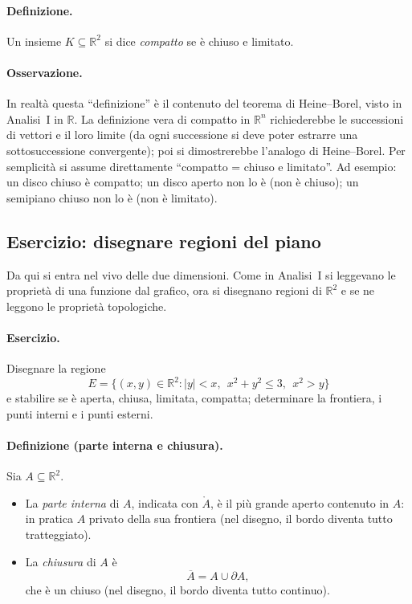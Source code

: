 \paragraph{Definizione.} Un insieme $K\subseteq\mathbb{R}^2$ si dice \emph{compatto} se è chiuso e limitato.

\paragraph{Osservazione.} In realtà questa ``definizione'' è il contenuto del teorema di Heine--Borel, visto in Analisi~I in $\mathbb{R}$. La definizione vera di compatto in $\mathbb{R}^n$ richiederebbe le successioni di vettori e il loro limite (da ogni successione si deve poter estrarre una sottosuccessione convergente); poi si dimostrerebbe l'analogo di Heine--Borel. Per semplicità si assume direttamente ``compatto = chiuso e limitato''.
Ad esempio: un disco chiuso è compatto; un disco aperto non lo è (non è chiuso); un semipiano chiuso non lo è (non è limitato).

\subsection{Esercizio: disegnare regioni del piano}

Da qui si entra nel vivo delle due dimensioni. Come in Analisi~I si leggevano le proprietà di una funzione dal grafico, ora si disegnano regioni di $\mathbb{R}^2$ e se ne leggono le proprietà topologiche.

\paragraph{Esercizio.} Disegnare la regione
\[
  E=\bigl\{(x,y)\in\mathbb{R}^2 : |y|<x,\ \ x^2+y^2\leq 3,\ \ x^2>y\bigr\}
\]
e stabilire se è aperta, chiusa, limitata, compatta; determinare la frontiera, i punti interni e i punti esterni.

\paragraph{Definizione (parte interna e chiusura).} Sia $A\subseteq\mathbb{R}^2$.
\begin{itemize}
  \item La \emph{parte interna} di $A$, indicata con $\mathring{A}$, è il più grande aperto contenuto in $A$: in pratica $A$ privato della sua frontiera (nel disegno, il bordo diventa tutto tratteggiato).
  \item La \emph{chiusura} di $A$ è
  \[
    \overline{A}=A\cup\partial A ,
  \]
  che è un chiuso (nel disegno, il bordo diventa tutto continuo).
\end{itemize}

